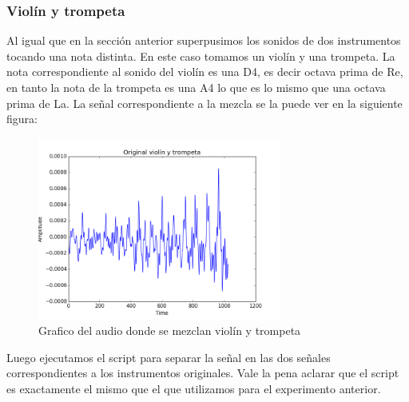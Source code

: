 \subsubsection{Violín y trompeta}
Al igual que en la sección anterior superpusimos los sonidos de dos instrumentos tocando una nota distinta. En este caso tomamos un violín y una trompeta. La nota correspondiente al sonido del violín es una D4, es decir octava prima de Re, en tanto la nota de la trompeta es una A4 lo que es lo mismo que una octava prima de La. La señal correspondiente a la mezcla se la puede ver en la siguiente figura:

\begin{figure}[h]
    \centering
    \includegraphics[height=60mm]{Content/Figures/orig_vio_trom.png}
    \caption{Grafico del audio donde se mezclan violín y trompeta}
\end{figure}

\newpage

Luego ejecutamos el script para separar la señal en las dos señales correspondientes a los instrumentos originales. Vale la pena aclarar que el script es exactamente el mismo que el que utilizamos para el experimento anterior.

